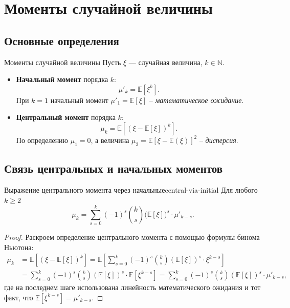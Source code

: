 
\section{Моменты случайной величины}

\subsection{Основные определения}

\begin{Definition}{Моменты случайной величины}{}
	Пусть $\xi$ — случайная величина, $k \in \mathbb{N}$.
	\begin{itemize}
		\item \textbf{Начальный момент} порядка $k$:
		\[
		\mu'_k = \mathbb{E}[\xi^k].
		\]
		При $k=1$ начальный момент $\mu'_1 = \mathbb{E}[\xi]$ --  \textit{математическое ожидание}.
		
		\item \textbf{Центральный момент} порядка $k$:
		\[
		\mu_k = \mathbb{E}\!\left[(\xi - \mathbb{E}[\xi])^k\right].
		\]
		По определению $\mu_1 = 0$, а величина $\mu_2 = \mathbb{E}[\xi - \mathbb{E}(\xi)]^{2}$ -- \textit{дисперсия}.
	\end{itemize}
\end{Definition}

\subsection{Связь центральных и начальных моментов}

\begin{Theorem}{Выражение центрального момента через начальные}{central-via-initial}
	Для любого $k \geq 2$
	\[
	\mu_k = \sum_{s=0}^{k} (-1)^s \binom{k}{s} \bigl(\mathbb{E}[\xi]\bigr)^s \cdot \mu'_{k-s}.
	\]
\end{Theorem}

\begin{proof}
Раскроем определение центрального момента с помощью формулы бинома Ньютона:
\begin{align*}
	\mu_k
	&= \mathbb{E}\!\left[(\xi - \mathbb{E}[\xi])^k\right]
	= \mathbb{E}\!\left[\sum_{s=0}^{k} (-1)^s \binom{k}{s} (\mathbb{E}[\xi])^s \cdot \xi^{k-s}\right] \\
	&= \sum_{s=0}^{k} (-1)^s \binom{k}{s} (\mathbb{E}[\xi])^s \cdot \mathbb{E}[\xi^{k-s}]
	= \sum_{s=0}^{k} (-1)^s \binom{k}{s} (\mathbb{E}[\xi])^s \cdot \mu'_{k-s},
\end{align*}
где на последнем шаге использована линейность математического ожидания и
тот факт, что $\mathbb{E}[\xi^{k-s}] = \mu'_{k-s}$.
\end{proof}

